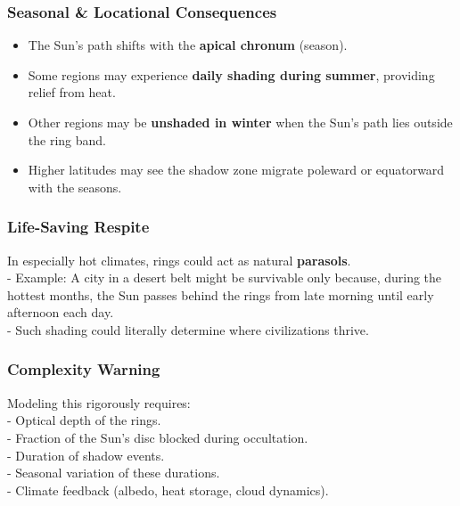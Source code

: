 \documentclass[
  letterpaper,
]{book}
\providecommand{\tightlist}{%
  \setlength{\itemsep}{0pt}\setlength{\parskip}{0pt}}
\begin{document}
\subsubsection{\texorpdfstring{\textbf{Seasonal \& Locational
Consequences}}{Seasonal \& Locational Consequences}}\label{seasonal-locational-consequences}

\begin{itemize}
\tightlist
\item
  The Sun's path shifts with the \textbf{apical chronum} (season).\\
\item
  Some regions may experience \textbf{daily shading during summer},
  providing relief from heat.\\
\item
  Other regions may be \textbf{unshaded in winter} when the Sun's path
  lies outside the ring band.\\
\item
  Higher latitudes may see the shadow zone migrate poleward or
  equatorward with the seasons.
\end{itemize}

\subsubsection{\texorpdfstring{\textbf{Life-Saving
Respite}}{Life-Saving Respite}}\label{life-saving-respite}

In especially hot climates, rings could act as natural
\textbf{parasols}.\\
- Example: A city in a desert belt might be survivable only because,
during the hottest months, the Sun passes behind the rings from late
morning until early afternoon each day.\\
- Such shading could literally determine where civilizations thrive.

\subsubsection{\texorpdfstring{\textbf{Complexity
Warning}}{Complexity Warning}}\label{complexity-warning}

Modeling this rigorously requires:\\
- Optical depth of the rings.\\
- Fraction of the Sun's disc blocked during occultation.\\
- Duration of shadow events.\\
- Seasonal variation of these durations.\\
- Climate feedback (albedo, heat storage, cloud dynamics).
\end{document}
